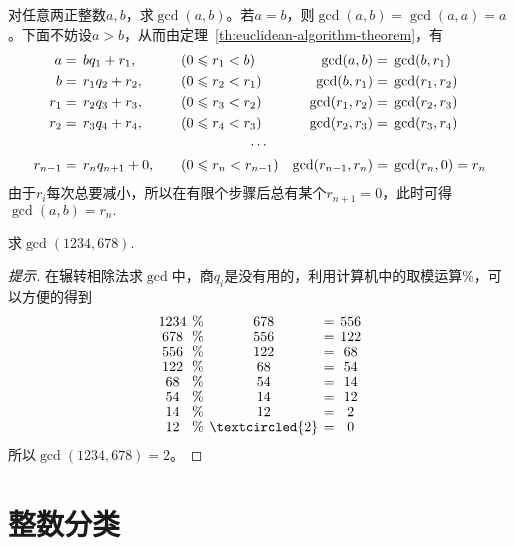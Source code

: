 \begin{definition}[辗转相除法]
  对任意两正整数$a,b$，求$\gcd(a,b)$。若$a=b$，则$\gcd(a,b)=\gcd(a,a)=a$。下面不妨设$a>b$，从而由定理~\ref{th:euclidean-algorithm-theorem}，有
  \begin{align*}
    a&=  \,bq_1 + r_1,   &&\quad(0\le r_1 < b)   & \gcd(a,b)    &=\,\gcd(b,r_1)\\
    b&=  \,r_1q_2 + r_2, &&\quad(0\le r_2 < r_1) & \gcd(b,r_1)  &=\,\gcd(r_1, r_2)\\ 
    r_1&=\,r_2q_3 + r_3, &&\quad(0\le r_3 < r_2) & \gcd(r_1,r_2)&=\,\gcd(r_2, r_3)\\
    r_2&=\,r_3q_4 + r_4, &&\quad(0\le r_4 < r_3) & \gcd(r_2,r_3)&=\,\gcd(r_3, r_4)\\
    \multicolumn{7}{c}{$\cdots$}\\
    r_{n-1}&=\,r_nq_{n+1} + 0, &&\quad(0\le r_n < r_{n-1}) & \gcd(r_{n-1},r_n)&=\,\gcd(r_{n}, 0)=r_{n}
  \end{align*}
  由于$r_i$每次总要减小，所以在有限个步骤后总有某个$r_{n+1}=0$，此时可得$\gcd(a,b)=r_n.$
\end{definition}

\begin{example}
  求$\gcd(1234,678).$
\end{example}
\begin{proof}[提示]在辗转相除法求$\gcd$中，商$q_i$是没有用的，利用计算机中的取模运算\%，可以方便的得到
  \begin{align*}\renewcommand{\arraystretch}{.9}\setlength{\arraycolsep}{2pt}
    \begin{array}{ccccc}
      1234 & \% & 678 & = & 556\\
      678  & \% & 556 & = & 122\\
      556  & \% & 122 & = & 68\\
      122  & \% & 68  & = & 54\\
      68   & \% & 54  & = & 14\\
      54   & \% & 14  & = & 12\\
      14   & \% & 12  & = & 2\\
      12   & \% & \textcircled{2}   & = & 0
    \end{array}
  \end{align*}
  所以$\gcd(1234,678)=2$。
\end{proof}

\section{整数分类}
\label{sec:category}

